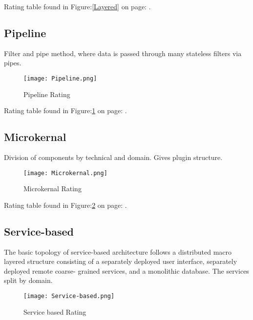 \documentclass[11pt]{scrartcl} %
\begin{document}
Rating table found in Figure:\ref{Layered} on page: \pageref{Layered}.

\subsection{Pipeline}

Filter and pipe method, where data is passed through many stateless filters via pipes.\\

\begin{figure}[h] %
	\centering
	\texttt{[image: Pipeline.png]} %
	\caption{Pipeline Rating}
  \label{Pipeline}
\end{figure}

Rating table found in Figure:\ref{Pipeline} on page: \pageref{Pipeline}.

\subsection{Microkernal}

Division of components by technical and domain. Gives plugin structure.\\

\begin{figure}[h] %
	\centering
	\texttt{[image: Microkernal.png]} %
	\caption{Microkernal Rating}
  \label{Microkernal}
\end{figure}

Rating table found in Figure:\ref{Microkernal} on page: \pageref{Microkernal}.

\subsection{Service-based}

The basic topology of service-based architecture follows a distributed macro layered
structure consisting of a separately deployed user interface, separately 
deployed remote coarse- grained services, and a monolithic database. The services split by domain.\\

\begin{figure}[h] %
	\centering
	\texttt{[image: Service-based.png]} %
	\caption{Service based Rating}
  \label{Service-based}
\end{figure}
\end{document}
